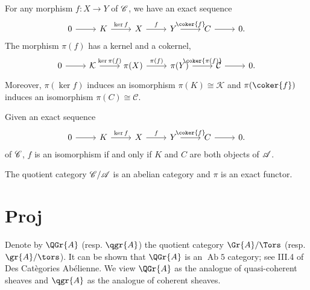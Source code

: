 \documentclass[10pt]{amsart}
\begin{document}
\begin{lem}
  For any morphism $f \colon X \rightarrow Y$ of $\mathscr{C}$, we have an exact sequence 
  $$\begin{tikzcd}
    0 \arrow{r} & K \arrow{r}{\ker{f}} & X \arrow{r}{f} & Y \arrow{r}{\coker{f}} & C \arrow{r} & 0.
  \end{tikzcd}$$ 
  The morphism $\pi(f)$ has a kernel and a cokernel,
  $$\begin{tikzcd}
    0 \arrow{r} & \mathcal{K} \arrow{r}{\ker{\pi(f)}} & \pi(X) \arrow{r}{\pi(f)} & \pi(Y) \arrow{r}{\coker{\pi(f)}} & \mathcal{C} \arrow{r} & 0.
  \end{tikzcd}$$
  Moreover, $\pi(\ker{f})$ induces an isomorphism $\pi(K) \cong \mathcal{K}$ and $\pi(\coker{f})$ induces an isomorphism $\pi(C) \cong \mathcal{C}$.
\end{lem}

\begin{lem}
  Given an exact sequence 
  $$\begin{tikzcd}
    0 \arrow{r} & K \arrow{r}{\ker{f}} & X \arrow{r}{f} & Y \arrow{r}{\coker{f}} & C \arrow{r} & 0.
  \end{tikzcd}$$ 
  of $\mathscr{C}$, $f$ is an isomorphism if and only if $K$ and $C$ are both objects of $\mathscr{A}$.
\end{lem}

\begin{prop}
  The quotient category $\mathscr{C}/\mathscr{A}$ is an abelian category and $\pi$ is an exact functor.
\end{prop}

\section{Proj}
Denote by $\QGr{A}$ (resp. $\qgr{A}$) the quotient category $\Gr{A}/\Tors$ (resp. $\gr{A}/\tors$).
It can be shown that $\QGr{A}$ is an $\operatorname{Ab} 5$ category; see III.4 of Des Cat\`{e}gories Ab\'{e}lienne.
We view $\QGr{A}$ as the analogue of quasi-coherent sheaves and $\qgr{A}$ as the analogue of coherent sheaves.
\end{document}
